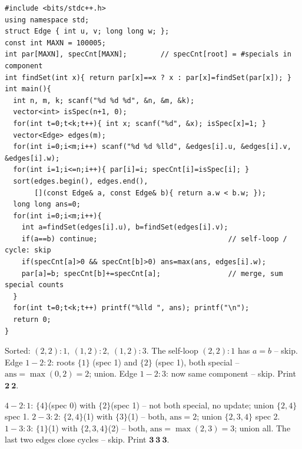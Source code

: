 \begin{lstlisting}[caption={CF 1081D. Kruskal with a per-component special count; answer = the largest weight of a union joining two special-bearing components, printed k times. Self-loops and duplicate edges are skipped by the a==b test}, label={lst:c17-maxdist}]
#include <bits/stdc++.h>
using namespace std;
struct Edge { int u, v; long long w; };
const int MAXN = 100005;
int par[MAXN], specCnt[MAXN];        // specCnt[root] = #specials in component
int findSet(int x){ return par[x]==x ? x : par[x]=findSet(par[x]); }
int main(){
  int n, m, k; scanf("%d %d %d", &n, &m, &k);
  vector<int> isSpec(n+1, 0);
  for(int t=0;t<k;t++){ int x; scanf("%d", &x); isSpec[x]=1; }
  vector<Edge> edges(m);
  for(int i=0;i<m;i++) scanf("%d %d %lld", &edges[i].u, &edges[i].v, &edges[i].w);
  for(int i=1;i<=n;i++){ par[i]=i; specCnt[i]=isSpec[i]; }
  sort(edges.begin(), edges.end(),
       [](const Edge& a, const Edge& b){ return a.w < b.w; });
  long long ans=0;
  for(int i=0;i<m;i++){
    int a=findSet(edges[i].u), b=findSet(edges[i].v);
    if(a==b) continue;                               // self-loop / cycle: skip
    if(specCnt[a]>0 && specCnt[b]>0) ans=max(ans, edges[i].w);
    par[a]=b; specCnt[b]+=specCnt[a];                // merge, sum special counts
  }
  for(int t=0;t<k;t++) printf("%lld ", ans); printf("\n");
  return 0;
}
\end{lstlisting}

\begin{tracebox}[Sample 1: \, \(n{=}2, m{=}3, k{=}2\), specials \(2,1\), edges \((1,2,3),(1,2,2),(2,2,1)\)]
Sorted: \((2,2){:}1,\ (1,2){:}2,\ (1,2){:}3\).  The self-loop \((2,2){:}1\) has
\(a=b\) -- skip.  Edge \(1\!-\!2{:}2\): roots \(\{1\}\) (spec 1) and \(\{2\}\) (spec 1),
both special -- \(\mathrm{ans}=\max(0,2)=2\); union.  Edge \(1\!-\!2{:}3\): now same
component -- skip.  Print \(\mathbf{2\ 2}\).
\end{tracebox}
\begin{tracebox}[Sample 2: \, \(n{=}4, m{=}5, k{=}3\), specials \(1,2,3\), edges sorted \(4\!-\!2{:}1,\ 2\!-\!3{:}2,\ 1\!-\!3{:}3,\ 1\!-\!4{:}4,\ 1\!-\!2{:}5\)]
\(4\!-\!2{:}1\): \(\{4\}\)(spec 0) with \(\{2\}\)(spec 1) -- not both special, no update;
union \(\{2,4\}\) spec 1.  \(2\!-\!3{:}2\): \(\{2,4\}\)(1) with \(\{3\}\)(1) -- both,
\(\mathrm{ans}=2\); union \(\{2,3,4\}\) spec 2.  \(1\!-\!3{:}3\): \(\{1\}\)(1) with
\(\{2,3,4\}\)(2) -- both, \(\mathrm{ans}=\max(2,3)=3\); union all.  The last two edges
close cycles -- skip.  Print \(\mathbf{3\ 3\ 3}\).
\end{tracebox}

